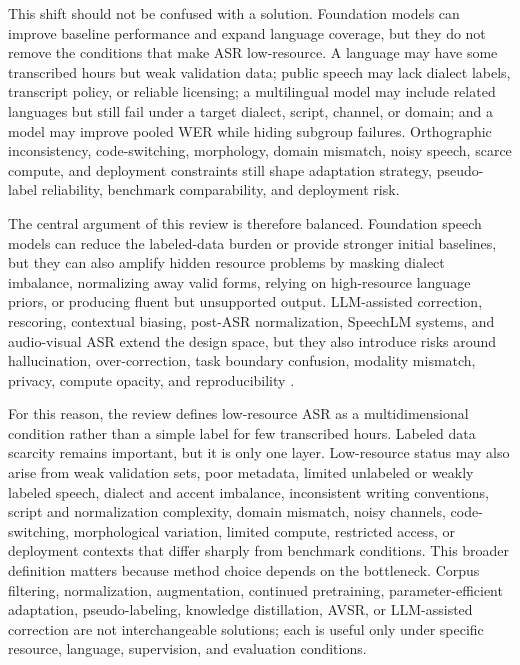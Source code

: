 \documentclass[pdflatex,sn-basic,iicol]{sn-jnl}
\theoremstyle{thmstyleone}
\theoremstyle{thmstyletwo}
\theoremstyle{thmstylethree}
\begin{document}
This shift should not be confused with a solution. Foundation models can improve baseline performance and expand language coverage, but they do not remove the conditions that make ASR low-resource. A language may have some transcribed hours but weak validation data; public speech may lack dialect labels, transcript policy, or reliable licensing; a multilingual model may include related languages but still fail under a target dialect, script, channel, or domain; and a model may improve pooled WER while hiding subgroup failures. Orthographic inconsistency, code-switching, morphology, domain mismatch, noisy speech, scarce compute, and deployment constraints still shape adaptation strategy, pseudo-label reliability, benchmark comparability, and deployment risk.

The central argument of this review is therefore balanced. Foundation speech models can reduce the labeled-data burden or provide stronger initial baselines, but they can also amplify hidden resource problems by masking dialect imbalance, normalizing away valid forms, relying on high-resource language priors, or producing fluent but unsupported output. LLM-assisted correction, rescoring, contextual biasing, post-ASR normalization, SpeechLM systems, and audio-visual ASR extend the design space, but they also introduce risks around hallucination, over-correction, task boundary confusion, modality mismatch, privacy, compute opacity, and reproducibility \citep{koenecke2024carelesswhisper,shi2022avhubert,anwar23_interspeech}.

For this reason, the review defines low-resource ASR as a multidimensional condition rather than a simple label for few transcribed hours. Labeled data scarcity remains important, but it is only one layer. Low-resource status may also arise from weak validation sets, poor metadata, limited unlabeled or weakly labeled speech, dialect and accent imbalance, inconsistent writing conventions, script and normalization complexity, domain mismatch, noisy channels, code-switching, morphological variation, limited compute, restricted access, or deployment contexts that differ sharply from benchmark conditions. This broader definition matters because method choice depends on the bottleneck. Corpus filtering, normalization, augmentation, continued pretraining, parameter-efficient adaptation, pseudo-labeling, knowledge distillation, AVSR, or LLM-assisted correction are not interchangeable solutions; each is useful only under specific resource, language, supervision, and evaluation conditions.
\end{document}
